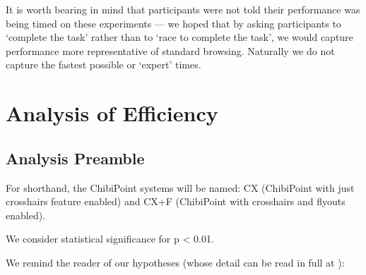 \documentclass[11pt,openright,a4paper]{report}
\begin{document}
It is worth bearing in mind that participants were not told their performance was being timed on these experiments --- we hoped that by asking participants to `complete the task' rather than to `race to complete the task', we would capture performance more representative of standard browsing. Naturally we do not capture the fastest possible or `expert' times.

\section{Analysis of Efficiency}
\subsection{Analysis Preamble}
For shorthand, the ChibiPoint systems will be named: CX (ChibiPoint with just crosshairs feature enabled) and CX+F (ChibiPoint with crosshairs and flyouts enabled).

We consider statistical significance for p < 0.01.

We remind the reader of our hypotheses (whose detail can be read in full at ):

\textbf{\hypone}\\
\textbf{\hyptwo}\\
\clearpage
\end{document}
